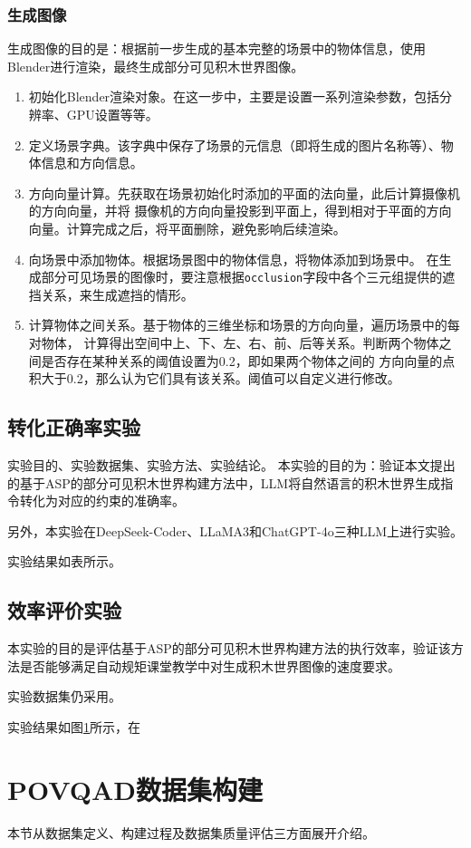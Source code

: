 \subsubsection{生成图像}
生成图像的目的是：根据前一步生成的基本完整的场景中的物体信息，使用Blender进行渲染，最终生成部分可见积木世界图像。
\begin{enumerate}[nosep]
\item 初始化Blender渲染对象。在这一步中，主要是设置一系列渲染参数，包括分辨率、GPU设置等等。
\item 定义场景字典。该字典中保存了场景的元信息（即将生成的图片名称等）、物体信息和方向信息。
\item 方向向量计算。先获取在场景初始化时添加的平面的法向量，此后计算摄像机的方向向量，并将
摄像机的方向向量投影到平面上，得到相对于平面的方向向量。计算完成之后，将平面删除，避免影响后续渲染。
\item 向场景中添加物体。根据场景图中的物体信息，将物体添加到场景中。
在生成部分可见场景的图像时，要注意根据\texttt{occlusion}字段中各个三元组提供的遮挡关系，来生成遮挡的情形。
\item 计算物体之间关系。基于物体的三维坐标和场景的方向向量，遍历场景中的每对物体，
计算得出空间中上、下、左、右、前、后等关系。判断两个物体之间是否存在某种关系的阈值设置为0.2，即如果两个物体之间的
方向向量的点积大于0.2，那么认为它们具有该关系。阈值可以自定义进行修改。
\end{enumerate}

\subsection{转化正确率实验}
实验目的、实验数据集、实验方法、实验结论。
本实验的目的为：验证本文提出的基于ASP的部分可见积木世界构建方法中，LLM将自然语言的积木世界生成指令转化为对应的约束的准确率。

另外，本实验在DeepSeek-Coder、LLaMA3和ChatGPT-4o三种LLM上进行实验。

实验结果如表所示。
\subsection{效率评价实验}
本实验的目的是评估基于ASP的部分可见积木世界构建方法的执行效率，验证该方法是否能够满足自动规矩课堂教学中对生成积木世界图像的速度要求。

实验数据集仍采用。

实验结果如图\ref{}所示，在
\section{POVQAD数据集构建}
本节从数据集定义、构建过程及数据集质量评估三方面展开介绍。
